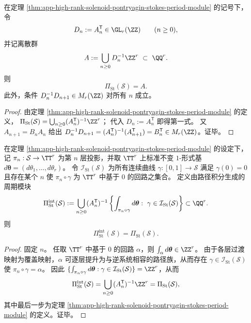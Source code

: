 
\begin{corollary}\label{cor:app-stokes-period-module-covector-normalization}
在定理 \ref{thm:app-high-rank-solenoid-pontryagin-stokes-period-module} 的记号下，
令
\[
D_n:=A_n^{\mathsf T}\in \GL_r(\ZZ)\qquad(n\ge 0),
\]
并记离散群
\[
A:=\bigcup_{n\ge 0}D_n^{-1}\ZZ^r\ \subset\ \QQ^r.
\]
则
\[
\Pi_{\mathrm{St}}(\mathcal S)=A.
\]
此外，条件 \(D_n^{-1}D_{n+1}\in M_r(\ZZ)\) 对所有 \(n\) 成立。
\end{corollary}
\begin{proof}
由定理 \ref{thm:app-high-rank-solenoid-pontryagin-stokes-period-module} 的定义，
\(
\Pi_{\mathrm{St}}(\mathcal S)=\bigcup_{n\ge 0}(A_n^{\mathsf T})^{-1}\ZZ^r
\)；
代入 \(D_n:=A_n^{\mathsf T}\) 即得第一式。
又 \(A_{n+1}=B_nA_n\) 给出 \(D_n^{-1}D_{n+1}=(A_n^{\mathsf T})^{-1}(A_{n+1}^{\mathsf T})=B_n^{\mathsf T}\in M_r(\ZZ)\)。证毕。
\end{proof}

\begin{proposition}\label{prop:app-stokes-period-module-path-integral-reconstruction}
在定理 \ref{thm:app-high-rank-solenoid-pontryagin-stokes-period-module} 的设定下，
记 \(\pi_n:\mathcal S\to \TT^r\) 为第 \(n\) 层投影，并取 \(\TT^r\) 上标准不变 \(1\)-形式基 \(d\boldsymbol\theta=(d\theta_1,\dots,d\theta_r)\)。
令 \(\mathcal I_{\mathrm{St}}(\mathcal S)\) 为所有连续曲线 \(\gamma:[0,1]\to\mathcal S\) 满足 \(\gamma(0)=0\) 且存在某个 \(n\) 使 \(\pi_n\circ\gamma\) 为 \(\TT^r\) 中基于 \(0\) 的回路之集合。
定义由路径积分生成的周期模块
\[
\Pi_{\mathrm{St}}^{\mathrm{int}}(\mathcal S)
:=\bigcup_{n\ge 0}(A_n^{\mathsf T})^{-1}
\left\{\int_{\pi_n\circ\gamma}d\boldsymbol\theta:\ \gamma\in \mathcal I_{\mathrm{St}}(\mathcal S)\right\}
\subset\QQ^r.
\]
则
\[
\Pi_{\mathrm{St}}^{\mathrm{int}}(\mathcal S)=\Pi_{\mathrm{St}}(\mathcal S).
\]
\end{proposition}
\begin{proof}
固定 \(n\)。
任取 \(\TT^r\) 中基于 \(0\) 的回路 \(\alpha\)，则
\(
\int_\alpha d\boldsymbol\theta\in\ZZ^r
\)。
由于各层过渡映射为覆盖映射，\(\alpha\) 可逐层提升为与逆系统相容的路径族，从而存在 \(\gamma\in\mathcal I_{\mathrm{St}}(\mathcal S)\) 使 \(\pi_n\circ\gamma=\alpha\)。
因此
\(
\{\int_{\pi_n\circ\gamma}d\boldsymbol\theta:\gamma\in\mathcal I_{\mathrm{St}}(\mathcal S)\}=\ZZ^r
\)，从而
\[
\Pi_{\mathrm{St}}^{\mathrm{int}}(\mathcal S)=\bigcup_{n\ge 0}(A_n^{\mathsf T})^{-1}\ZZ^r=\Pi_{\mathrm{St}}(\mathcal S),
\]
其中最后一步为定理 \ref{thm:app-high-rank-solenoid-pontryagin-stokes-period-module} 的定义。证毕。
\end{proof}

